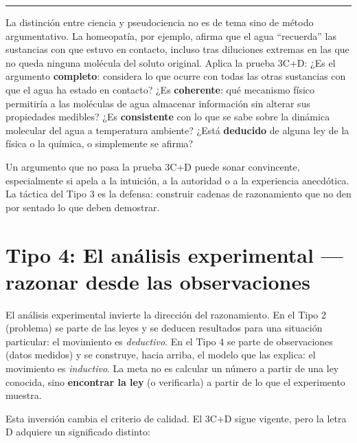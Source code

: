 \documentclass[11pt]{book}
\begin{document}
\medskip
\noindent\rule{\linewidth}{0.4pt}


\medskip
La distinción entre ciencia y pseudociencia no es de tema sino de método argumentativo. La homeopatía, por ejemplo, afirma que el agua ``recuerda'' las sustancias con que estuvo en contacto, incluso tras diluciones extremas en las que no queda ninguna molécula del soluto original. Aplica la prueba 3C+D: ¿Es el argumento {\bf completo}: considera lo que ocurre con todas las otras sustancias con que el agua ha estado en contacto? ¿Es {\bf coherente}: qué mecanismo físico permitiría a las moléculas de agua almacenar información sin alterar sus propiedades medibles? ¿Es {\bf consistente} con lo que se sabe sobre la dinámica molecular del agua a temperatura ambiente? ¿Está {\bf deducido} de alguna ley de la física o la química, o simplemente se afirma?

Un argumento que no pasa la prueba 3C+D puede sonar convincente, especialmente si apela a la intuición, a la autoridad o a la experiencia anecdótica. La táctica del Tipo 3 es la defensa: construir cadenas de razonamiento que no den por sentado lo que deben demostrar.

\section{Tipo 4: El análisis experimental --- razonar desde las observaciones}

El análisis experimental invierte la dirección del razonamiento. En el Tipo 2 (problema) se parte de las leyes y se deducen resultados para una situación particular: el movimiento es {\it deductivo}. En el Tipo 4 se parte de observaciones (datos medidos) y se construye, hacia arriba, el modelo que las explica: el movimiento es {\it inductivo}. La meta no es calcular un número a partir de una ley conocida, sino {\bf encontrar la ley} (o verificarla) a partir de lo que el experimento muestra.

Esta inversión cambia el criterio de calidad. El 3C+D sigue vigente, pero la letra D adquiere un significado distinto:
\end{document}
